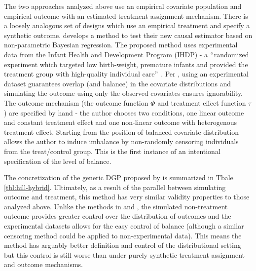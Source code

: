 \documentclass[../main.tex]{subfiles}
\begin{document}
\vspace{\baselineskip}
The two approaches analyzed above use an empirical covariate population and empirical outcome with an estimated treatment assignment mechanism. There is a loosely analogous set of designs which use an empirical treatment and specify a synthetic outcome. \cite{Hill2011BayesianInference} develops a method to test their new causal estimator based on non-parametric Bayesian regression. The proposed method uses experimental data from the Infant Health and Development Program (IHDP) - a $``$randomized experiment which targeted low birth-weight, premature infants and provided the treatment group with high-quality individual care$"$ \cite{Brooks-Gunn1991TheProgram}. Per \cite{Hill2011BayesianInference}, using an experimental dataset guarantees overlap (and balance) in the covariate distributions and simulating the outcome using only the observed covariates ensures ignorability. The outcome mechanism (the outcome function  \(  \Phi  \) and treatment effect function  \(  \tau \) ) are specified by hand - the author chooses two conditions, one linear outcome and constant treatment effect and one non-linear outcome with heterogenous treatment effect. Starting from the position of balanced covariate distribution allows the author to induce imbalance by non-randomly censoring individuals from the treat/control group. This is the first instance of an intentional specification of the level of balance.\par


\vspace{\baselineskip}
The concretization of the generic DGP proposed by \cite{Hill2011BayesianInference} is summarized in Tbale \ref{tbl:hill-hybrid}. Ultimately, as a result of the parallel between simulating outcome and treatment, this method has very similar validity properties to those analyzed above. Unlike the methods in \cite{Huber2013TheScore} and \cite{Knaus2018MachineEvidence}, the simulated non-treatment outcome provides greater control over the distribution of outcomes and the experimental datasets allows for the easy control of balance (although a similar censoring method could be applied to non-experimental data). This means the method has arguably better definition and control of the distributional setting but this control is still worse than under purely synthetic treatment assignment and outcome mechanisms.\par
\end{document}
